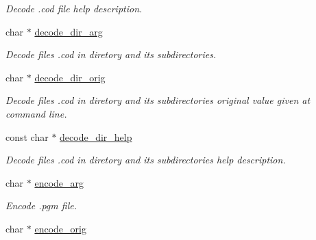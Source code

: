 \begin{DoxyCompactItemize}
\begin{DoxyCompactList}\small\item\em Decode .cod file help description. \end{DoxyCompactList}\item 
\hypertarget{structgengetopt__args__info_a64bb86483a3fa47270e2789c4f2a50f9}{}char $\ast$ \hyperlink{structgengetopt__args__info_a64bb86483a3fa47270e2789c4f2a50f9}{decode\+\_\+dir\+\_\+arg}\label{structgengetopt__args__info_a64bb86483a3fa47270e2789c4f2a50f9}

\begin{DoxyCompactList}\small\item\em Decode files .cod in diretory and its subdirectories. \end{DoxyCompactList}\item 
\hypertarget{structgengetopt__args__info_af4ef92b1ad56c68625c7ab5e4fd69434}{}char $\ast$ \hyperlink{structgengetopt__args__info_af4ef92b1ad56c68625c7ab5e4fd69434}{decode\+\_\+dir\+\_\+orig}\label{structgengetopt__args__info_af4ef92b1ad56c68625c7ab5e4fd69434}

\begin{DoxyCompactList}\small\item\em Decode files .cod in diretory and its subdirectories original value given at command line. \end{DoxyCompactList}\item 
\hypertarget{structgengetopt__args__info_a7d3d8b8d9ab12e0dcd7a7f29714caa06}{}const char $\ast$ \hyperlink{structgengetopt__args__info_a7d3d8b8d9ab12e0dcd7a7f29714caa06}{decode\+\_\+dir\+\_\+help}\label{structgengetopt__args__info_a7d3d8b8d9ab12e0dcd7a7f29714caa06}

\begin{DoxyCompactList}\small\item\em Decode files .cod in diretory and its subdirectories help description. \end{DoxyCompactList}\item 
\hypertarget{structgengetopt__args__info_a1f3899794e9d3ada52af69efd21635cc}{}char $\ast$ \hyperlink{structgengetopt__args__info_a1f3899794e9d3ada52af69efd21635cc}{encode\+\_\+arg}\label{structgengetopt__args__info_a1f3899794e9d3ada52af69efd21635cc}

\begin{DoxyCompactList}\small\item\em Encode .pgm file. \end{DoxyCompactList}\item 
\hypertarget{structgengetopt__args__info_a7959f43c3a7cda017098c63088be8bbb}{}char $\ast$ \hyperlink{structgengetopt__args__info_a7959f43c3a7cda017098c63088be8bbb}{encode\+\_\+orig}\label{structgengetopt__args__info_a7959f43c3a7cda017098c63088be8bbb}


\end{DoxyCompactItemize}
